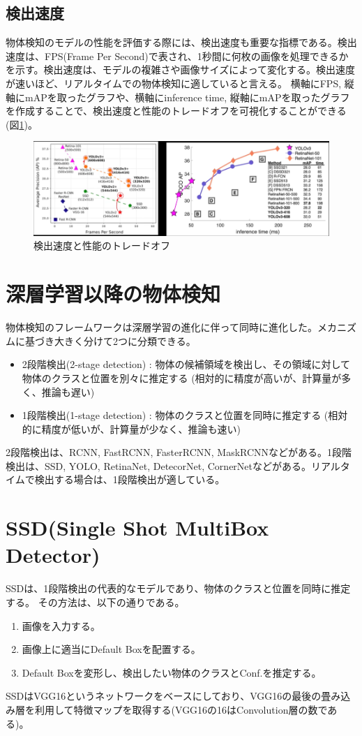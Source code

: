 \documentclass{ltjsarticle}
\begin{document}
\subsection{検出速度}
物体検知のモデルの性能を評価する際には、検出速度も重要な指標である。検出速度は、FPS(Frame Per Second)で表され、1秒間に何枚の画像を処理できるかを示す。検出速度は、モデルの複雑さや画像サイズによって変化する。検出速度が速いほど、リアルタイムでの物体検知に適していると言える。
横軸にFPS, 縦軸にmAPを取ったグラフや、横軸にinference time, 縦軸にmAPを取ったグラフを作成することで、検出速度と性能のトレードオフを可視化することができる(図\ref{fig:Speed_Accuracy})。
\begin{figure}[htbp]
  \centering
  \includegraphics[width=14cm]{./capture/Speed_Acuracy.png}
  \caption{検出速度と性能のトレードオフ}
  \label{fig:Speed_Accuracy}
\end{figure}

\clearpage
\section{深層学習以降の物体検知}
物体検知のフレームワークは深層学習の進化に伴って同時に進化した。メカニズムに基づき大きく分けて2つに分類できる。
\begin{itemize}
  \item 2段階検出(2-stage detection) : 物体の候補領域を検出し、その領域に対して物体のクラスと位置を別々に推定する (相対的に精度が高いが、計算量が多く、推論も遅い)
  \item 1段階検出(1-stage detection) : 物体のクラスと位置を同時に推定する (相対的に精度が低いが、計算量が少なく、推論も速い)
\end{itemize}
2段階検出は、RCNN, FastRCNN, FasterRCNN, MaskRCNNなどがある。1段階検出は、SSD, YOLO, RetinaNet, DetecorNet, CornerNetなどがある。リアルタイムで検出する場合は、1段階検出が適している。

\clearpage
\section{SSD(Single Shot MultiBox Detector)}
SSDは、1段階検出の代表的なモデルであり、物体のクラスと位置を同時に推定する。
その方法は、以下の通りである。
\begin{enumerate}
  \item 画像を入力する。
  \item 画像上に適当にDefault Boxを配置する。
  \item Default Boxを変形し、検出したい物体のクラスとConf.を推定する。
\end{enumerate}
SSDはVGG16というネットワークをベースにしており、VGG16の最後の畳み込み層を利用して特徴マップを取得する(VGG16の16はConvolution層の数である)。
\end{document}
